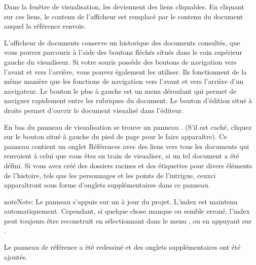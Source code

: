 \documentclass[a4paper,11pt,french]{sphinxmanual}
\begin{document}
\sphinxAtStartPar
Dans la fenêtre de visualisation, les {\hyperref[\detokenize{int_glossary:term-Reference}]{}} deviennent des liens cliquables. En cliquant sur ces liens, le contenu de l’afficheur est remplacé par le contenu du document auquel la référence renvoie.

\sphinxAtStartPar
L’afficheur de documents conserve un historique des documents consultés, que vous pouvez parcourir à l’aide des boutons fléchés situés dans le coin supérieur gauche du visualiseur. Si votre souris possède des boutons de navigation vers l’avant et vers l’arrière, vous pouvez également les utiliser. Ils fonctionnent de la même manière que les fonctions de navigation vers l’avant et vers l’arrière d’un navigateur. Le bouton le plus à gauche est un menu déroulant qui permet de naviguer rapidement entre les rubriques du document. Le bouton d’édition situé à droite permet d’ouvrir le document visualisé dans l’éditeur.

\sphinxAtStartPar
En bas du panneau de visualisation se trouve un panneau . (S’il est caché, cliquez sur le bouton situé à gauche du pied de page pour le faire apparaître). Ce panneau contient un onglet Références avec des liens vers tous les documents qui renvoient à celui que vous êtes en train de visualiser, si un tel document a été défini. Si vous avez créé des dossiers racines et des étiquettes pour divers éléments de l’histoire, tels que les personnages et les points de l’intrigue, ceux\sphinxhyphen{}ci apparaîtront sous forme d’onglets supplémentaires dans ce panneau.

\begin{sphinxadmonition}{note}{Note:}
\sphinxAtStartPar
Le panneau  s’appuie sur un {\hyperref[\detokenize{int_glossary:term-Project-Index}]{}} à jour du projet. L’index est maintenu automatiquement. Cependant, si quelque chose manque ou semble erroné, l’index peut toujours être reconstruit en sélectionnant  dans le menu , ou en appuyant sur .
\end{sphinxadmonition}

\sphinxAtStartPar
{}Le panneau de référence a été redessiné et des onglets supplémentaires ont été ajoutés.
\end{document}
